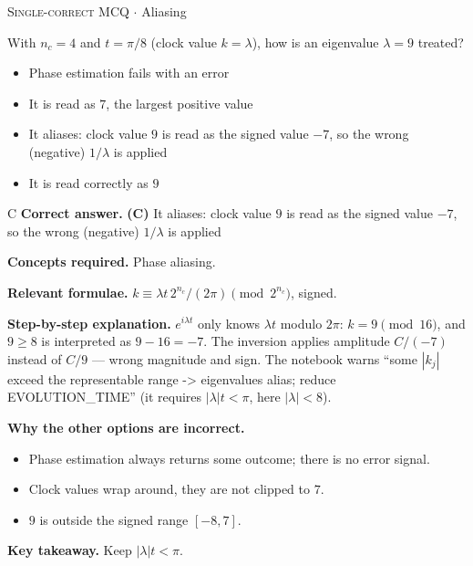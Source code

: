 \documentclass[11pt,a4paper]{article}
\newcommand{\optlabel}[1]{\textbf{(#1)}}
\newcommand{\correctlabel}[1]{\textcolor{okgreen}{\textbf{(#1)}\,\ding{51}}}
\newenvironment{qitem}[1]{\begin{list}{}{\setlength{\leftmargin}{3.3em}\setlength{\labelwidth}{3.1em}%
  \setlength{\labelsep}{0.2em}\setlength{\topsep}{3pt}\setlength{\parsep}{3pt}}\item[\textbf{Q.#1}\hfill]}{\end{list}}
\newcommand{\qsep}{\par\vspace{2pt}{\color{black!15}\hrule}\vspace{4pt}}
\newcommand{\qmeta}[2]{{\footnotesize\color{black!60}\textsc{#1} \;$\cdot$\; #2}\par}
\begin{document}
\begin{qitem}{71}
\qmeta{Single-correct MCQ}{Aliasing}
With $n_c = 4$ and $t = \pi/8$ (clock value $k = \lambda$), how is an eigenvalue $\lambda = 9$ treated?
\begin{itemize}[leftmargin=2.6em, labelsep=0.4em, itemsep=2pt, topsep=3pt]
\item[\optlabel{A}] Phase estimation fails with an error
\item[\optlabel{B}] It is read as $7$, the largest positive value
\item[\correctlabel{C}] It aliases: clock value $9$ is read as the signed value $-7$, so the wrong (negative) $1/\lambda$ is applied
\item[\optlabel{D}] It is read correctly as $9$
\end{itemize}
\end{qitem}
\begin{solbox}{C}
\textbf{\color{brand}Correct answer.} \textcolor{okgreen}{\textbf{(C)}} It aliases: clock value $9$ is read as the signed value $-7$, so the wrong (negative) $1/\lambda$ is applied

\textbf{\color{brand}Concepts required.} Phase aliasing.

\textbf{\color{brand}Relevant formulae.} $k \equiv \lambda t\,2^{n_c}/(2\pi) \pmod{2^{n_c}}$, signed.

\textbf{\color{brand}Step-by-step explanation.} $e^{i\lambda t}$ only knows $\lambda t$ modulo $2\pi$: $k = 9 \pmod{16}$, and $9 \ge 8$ is interpreted as $9 - 16 = -7$. The inversion applies amplitude $C/(-7)$ instead of $C/9$ --- wrong
magnitude and sign. The notebook warns ``some $|k_j|$ exceed the representable range -> eigenvalues alias; reduce EVOLUTION\_TIME'' (it requires $|\lambda|t < \pi$, here $|\lambda| < 8$).

\textbf{\color{brand}Why the other options are incorrect.}
\begin{itemize}[leftmargin=2.4em, itemsep=1pt, topsep=2pt]
\item[\textbf{(A)}] Phase estimation always returns some outcome; there is no error signal.
\item[\textbf{(B)}] Clock values wrap around, they are not clipped to $7$.
\item[\textbf{(D)}] $9$ is outside the signed range $[-8, 7]$.
\end{itemize}
\textbf{\color{brand}Key takeaway.} Keep $|\lambda|t < \pi$.
\end{solbox}
\qsep
\end{document}
